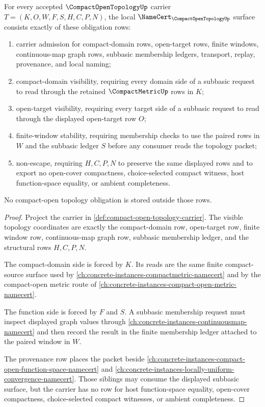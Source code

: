\begin{theorem}
\label{thm:compact-open-topology-namecert-obligations}
For every accepted $\CompactOpenTopologyUp$ carrier $T=(K,O,W,F,S,H,C,P,N)$, the local $\NameCert_{\CompactOpenTopologyUp}$ surface consists exactly of these obligation rows:
\begin{enumerate}
\item carrier admission for compact-domain rows, open-target rows, finite windows, continuous-map graph rows, subbasic membership ledgers, transport, replay, provenance, and local naming;
\item compact-domain visibility, requiring every domain side of a subbasic request to read through the retained $\CompactMetricUp$ rows in $K$;
\item open-target visibility, requiring every target side of a subbasic request to read through the displayed open-target row $O$;
\item finite-window stability, requiring membership checks to use the paired rows in $W$ and the subbasic ledger $S$ before any consumer reads the topology packet;
\item non-escape, requiring $H,C,P,N$ to preserve the same displayed rows and to export no open-cover compactness, choice-selected compact witness, host function-space equality, or ambient completeness.
\end{enumerate}
No compact-open topology obligation is stored outside those rows.
\end{theorem}
\begin{proof}
Project the carrier in \autoref{def:compact-open-topology-carrier}. The visible topology coordinates are exactly the compact-domain row, open-target row, finite window row, continuous-map graph row, subbasic membership ledger, and the structural rows $H,C,P,N$.

The compact-domain side is forced by $K$. Its reads are the same finite compact-source surface used by \autoref{ch:concrete-instances-compactmetric-namecert} and by the compact-open metric route of \autoref{ch:concrete-instances-compact-open-metric-namecert}.

The function side is forced by $F$ and $S$. A subbasic membership request must inspect displayed graph values through \autoref{ch:concrete-instances-continuousmap-namecert} and then record the result in the finite membership ledger attached to the paired window in $W$.

The provenance row places the packet beside \autoref{ch:concrete-instances-compact-open-function-space-namecert} and \autoref{ch:concrete-instances-locally-uniform-convergence-namecert}. Those siblings may consume the displayed subbasic surface, but the carrier has no row for host function-space equality, open-cover compactness, choice-selected compact witnesses, or ambient completeness.
\end{proof}

